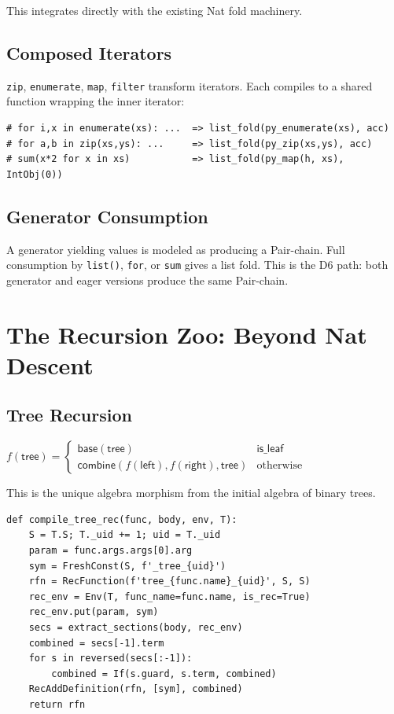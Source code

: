 This integrates directly with the existing Nat fold machinery.

\section{Composed Iterators}

\texttt{zip}, \texttt{enumerate}, \texttt{map}, \texttt{filter}
transform iterators.  Each compiles to a shared function wrapping the
inner iterator:
\begin{lstlisting}[caption={Composed iterators}]
# for i,x in enumerate(xs): ...  => list_fold(py_enumerate(xs), acc)
# for a,b in zip(xs,ys): ...     => list_fold(py_zip(xs,ys), acc)
# sum(x*2 for x in xs)           => list_fold(py_map(h, xs), IntObj(0))
\end{lstlisting}

\section{Generator Consumption}

A generator yielding values is modeled as producing a Pair-chain.
Full consumption by \texttt{list()}, \texttt{for}, or \texttt{sum}
gives a list fold.  This is the D6 path: both generator and eager
versions produce the same Pair-chain.


\chapter{The Recursion Zoo: Beyond Nat Descent}
\label{ch:recursion-zoo}

\section{Tree Recursion}

\begin{definition}
$f(\mathsf{tree}) = \begin{cases}
\mathsf{base}(\mathsf{tree}) & \mathsf{is\_leaf} \\
\mathsf{combine}(f(\mathsf{left}), f(\mathsf{right}), \mathsf{tree})
  & \text{otherwise}
\end{cases}$

This is the unique algebra morphism from the initial algebra of
binary trees.
\end{definition}

\begin{lstlisting}[caption={Tree recursion Z3 encoding}]
def compile_tree_rec(func, body, env, T):
    S = T.S; T._uid += 1; uid = T._uid
    param = func.args.args[0].arg
    sym = FreshConst(S, f'_tree_{uid}')
    rfn = RecFunction(f'tree_{func.name}_{uid}', S, S)
    rec_env = Env(T, func_name=func.name, is_rec=True)
    rec_env.put(param, sym)
    secs = extract_sections(body, rec_env)
    combined = secs[-1].term
    for s in reversed(secs[:-1]):
        combined = If(s.guard, s.term, combined)
    RecAddDefinition(rfn, [sym], combined)
    return rfn
\end{lstlisting}

